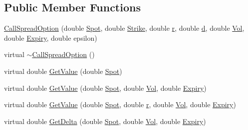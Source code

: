 \subsection*{Public Member Functions}
\begin{DoxyCompactItemize}
\item 
\hyperlink{classMyOption_1_1CallSpreadOption_a5d9a2c5d587451e30c49aed0f48f4dc4}{Call\+Spread\+Option} (double \hyperlink{classMyOption_1_1Option_a6c6f01d75cde7e92d16a6d8d6f331a1d}{Spot}, double \hyperlink{classMyOption_1_1Option_a3033c483588ce26b175280c7f9dee8d1}{Strike}, double \hyperlink{classMyOption_1_1Option_aa8cb250427dece65ea49255d4102cc8d}{r}, double \hyperlink{classMyOption_1_1Option_a500979f4b32262594d895c4a83b58d1d}{d}, double \hyperlink{classMyOption_1_1Option_a5d6002c14b335c782873bf1437113513}{Vol}, double \hyperlink{classMyOption_1_1Option_ac1adacb417fede41d151b9cda05bcb3d}{Expiry}, double epsilon)
\item 
virtual \hyperlink{classMyOption_1_1CallSpreadOption_a20c0f91c648645718aa27007399101e7}{$\sim$\+Call\+Spread\+Option} ()
\item 
virtual double \hyperlink{classMyOption_1_1CallSpreadOption_a8f9317c21aad28bc1cd78a403b5e4cd3}{Get\+Value} (double \hyperlink{classMyOption_1_1Option_a6c6f01d75cde7e92d16a6d8d6f331a1d}{Spot})
\item 
virtual double \hyperlink{classMyOption_1_1CallSpreadOption_a99b187caf21ba9b6f505923d9e785c12}{Get\+Value} (double \hyperlink{classMyOption_1_1Option_a6c6f01d75cde7e92d16a6d8d6f331a1d}{Spot}, double \hyperlink{classMyOption_1_1Option_a5d6002c14b335c782873bf1437113513}{Vol}, double \hyperlink{classMyOption_1_1Option_ac1adacb417fede41d151b9cda05bcb3d}{Expiry})
\item 
virtual double \hyperlink{classMyOption_1_1CallSpreadOption_a5e88bf671572da6441db916620c5c202}{Get\+Value} (double \hyperlink{classMyOption_1_1Option_a6c6f01d75cde7e92d16a6d8d6f331a1d}{Spot}, double \hyperlink{classMyOption_1_1Option_aa8cb250427dece65ea49255d4102cc8d}{r}, double \hyperlink{classMyOption_1_1Option_a5d6002c14b335c782873bf1437113513}{Vol}, double \hyperlink{classMyOption_1_1Option_ac1adacb417fede41d151b9cda05bcb3d}{Expiry})
\item 
virtual double \hyperlink{classMyOption_1_1CallSpreadOption_a4655116155bf4551129eda47625acef0}{Get\+Delta} (double \hyperlink{classMyOption_1_1Option_a6c6f01d75cde7e92d16a6d8d6f331a1d}{Spot}, double \hyperlink{classMyOption_1_1Option_a5d6002c14b335c782873bf1437113513}{Vol}, double \hyperlink{classMyOption_1_1Option_ac1adacb417fede41d151b9cda05bcb3d}{Expiry})

\end{DoxyCompactItemize}
